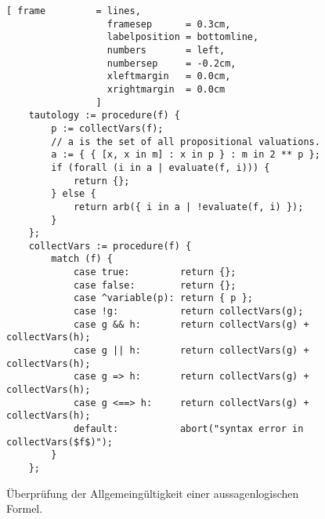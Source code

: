 \begin{figure}[!ht]
  \centering
\begin{Verbatim}[ frame         = lines, 
                  framesep      = 0.3cm, 
                  labelposition = bottomline,
                  numbers       = left,
                  numbersep     = -0.2cm,
                  xleftmargin   = 0.0cm,
                  xrightmargin  = 0.0cm
                ]
    tautology := procedure(f) {
        p := collectVars(f);
        // a is the set of all propositional valuations.
        a := { { [x, x in m] : x in p } : m in 2 ** p };
        if (forall (i in a | evaluate(f, i))) {
            return {};
        } else {
            return arb({ i in a | !evaluate(f, i) });
        }
    };
    collectVars := procedure(f) {
        match (f) {
            case true:         return {};
            case false:        return {};
            case ^variable(p): return { p };
            case !g:           return collectVars(g);
            case g && h:       return collectVars(g) + collectVars(h);
            case g || h:       return collectVars(g) + collectVars(h);
            case g => h:       return collectVars(g) + collectVars(h);
            case g <==> h:     return collectVars(g) + collectVars(h);
            default:           abort("syntax error in collectVars($f$)");
        }
    };    
\end{Verbatim}
\vspace*{-0.3cm}
  \caption{\"{U}berpr\"{u}fung der Allgemeing\"{u}ltigkeit einer aussagenlogischen Formel.}
  \label{fig:tautology.stlx}
\end{figure} 

